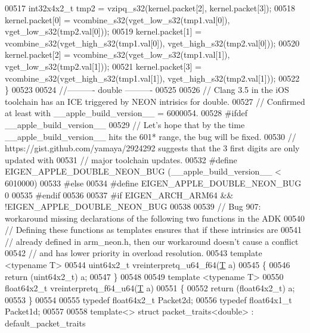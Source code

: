 \begin{DoxyCode}
{{00517   int32x4x2\_t tmp2 = vzipq\_s32(kernel.packet[2], kernel.packet[3]);
00518   kernel.packet[0] = vcombine\_s32(vget\_low\_s32(tmp1.val[0]), vget\_low\_s32(tmp2.val[0]));
00519   kernel.packet[1] = vcombine\_s32(vget\_high\_s32(tmp1.val[0]), vget\_high\_s32(tmp2.val[0]));
00520   kernel.packet[2] = vcombine\_s32(vget\_low\_s32(tmp1.val[1]), vget\_low\_s32(tmp2.val[1]));
00521   kernel.packet[3] = vcombine\_s32(vget\_high\_s32(tmp1.val[1]), vget\_high\_s32(tmp2.val[1]));
00522 \}
00523 
00524 \textcolor{comment}{//---------- double ----------}
00525 
00526 \textcolor{comment}{// Clang 3.5 in the iOS toolchain has an ICE triggered by NEON intrisics for double.}
00527 \textcolor{comment}{// Confirmed at least with \_\_apple\_build\_version\_\_ = 6000054.}
00528 \textcolor{preprocessor}{#ifdef \_\_apple\_build\_version\_\_}
00529 \textcolor{comment}{// Let's hope that by the time \_\_apple\_build\_version\_\_ hits the 601* range, the bug will be fixed.}
00530 \textcolor{comment}{// https://gist.github.com/yamaya/2924292 suggests that the 3 first digits are only updated with}
00531 \textcolor{comment}{// major toolchain updates.}
00532 \textcolor{preprocessor}{#define EIGEN\_APPLE\_DOUBLE\_NEON\_BUG (\_\_apple\_build\_version\_\_ < 6010000)}
00533 \textcolor{preprocessor}{#else}
00534 \textcolor{preprocessor}{#define EIGEN\_APPLE\_DOUBLE\_NEON\_BUG 0}
00535 \textcolor{preprocessor}{#endif}
00536 
00537 \textcolor{preprocessor}{#if EIGEN\_ARCH\_ARM64 && !EIGEN\_APPLE\_DOUBLE\_NEON\_BUG}
00538 
00539 \textcolor{comment}{// Bug 907: workaround missing declarations of the following two functions in the ADK}
00540 \textcolor{comment}{// Defining these functions as templates ensures that if these intrinsics are}
00541 \textcolor{comment}{// already defined in arm\_neon.h, then our workaround doesn't cause a conflict}
00542 \textcolor{comment}{// and has lower priority in overload resolution.}
00543 \textcolor{keyword}{template} <\textcolor{keyword}{typename} T>
00544 uint64x2\_t vreinterpretq\_u64\_f64(\hyperlink{group___sparse_core___module_class_eigen_1_1_triplet}{T} a)
00545 \{
00546   \textcolor{keywordflow}{return} (uint64x2\_t) a;
00547 \}
00548 
00549 \textcolor{keyword}{template} <\textcolor{keyword}{typename} T>
00550 float64x2\_t vreinterpretq\_f64\_u64(\hyperlink{group___sparse_core___module_class_eigen_1_1_triplet}{T} a)
00551 \{
00552   \textcolor{keywordflow}{return} (float64x2\_t) a;
00553 \}
00554 
00555 \textcolor{keyword}{typedef} float64x2\_t Packet2d;
00556 \textcolor{keyword}{typedef} float64x1\_t Packet1d;
00557 
00558 \textcolor{keyword}{template}<> \textcolor{keyword}{struct }packet\_traits<double>  : default\_packet\_traits
}}
\end{DoxyCode}
